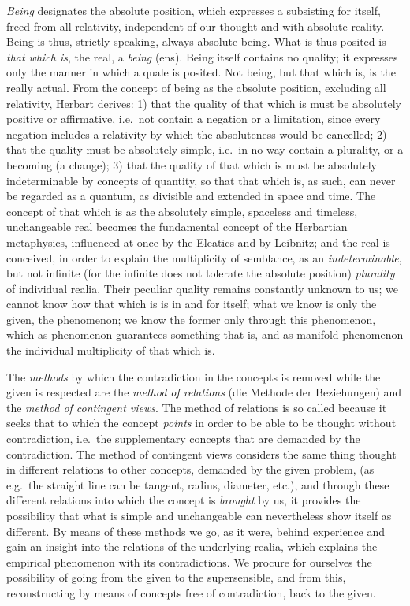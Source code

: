 \emph{Being} designates the absolute position, which expresses a
subsisting for itself, freed from all relativity, independent of our
thought and with absolute reality. Being is thus, strictly speaking,
always absolute being. What is thus posited is \emph{that which is}, the
real, a \emph{being} (ens). Being itself contains no quality; it
expresses only the manner in which a quale is posited. Not being, but
that which is, is the really actual. From the concept of being as the
absolute position, excluding all relativity, Herbart derives: 1) that the
quality of that which is must be absolutely positive or affirmative,
i.e.\ not contain a negation or a limitation, since every negation
includes a relativity by which the absoluteness would be
cancelled; 2) that the quality must be absolutely simple, i.e.\ in no way
contain a plurality, or a becoming (a change); 3) that the quality of that
which is must be absolutely indeterminable by concepts of quantity, so
that that which is, as such, can never be regarded as a quantum, as
divisible and extended in space and time. The concept of that which is as
the absolutely simple, spaceless and timeless, unchangeable real becomes
the fundamental concept of the Herbartian metaphysics, influenced at once
by the Eleatics and by Leibnitz; and the real is conceived, in order to
explain the multiplicity of semblance, as an \emph{indeterminable}, but
not infinite (for the infinite does not tolerate the absolute position)
\emph{plurality} of individual realia. Their peculiar quality remains
constantly unknown to us; we cannot know how that which is is in and for
itself; what we know is only the given, the phenomenon; we know the
former only through this phenomenon, which as phenomenon guarantees
something that is, and as manifold phenomenon the individual
multiplicity of that which is.

The \emph{methods} by which the contradiction in the concepts is removed
while the given is respected are the \emph{method of relations} (die
Methode der Beziehungen) and the \emph{method of contingent views}. The
method of relations is so called because it seeks that to which the
concept \emph{points} in order to be able to be thought without
contradiction, i.e.\ the supplementary concepts that are demanded by the
contradiction. The method of contingent views considers the same thing
thought in different relations to other concepts, demanded by the given
problem, (as e.g.\ the straight line can be tangent, radius, diameter,
etc.), and through these different relations into which the concept is
\emph{brought} by us, it provides the possibility that what is simple and
unchangeable can nevertheless show itself as different. By means of these
methods we go, as it were, behind experience and gain an insight into the
relations of the underlying realia, which explains the empirical
phenomenon with its contradictions. We procure for ourselves the
possibility of going from the given to the supersensible, and
from this, reconstructing by means of concepts free of contradiction,
back to the given.

